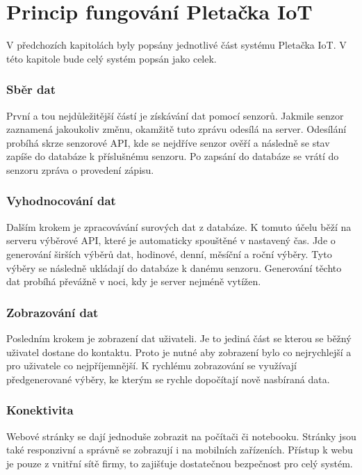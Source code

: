 \chapter{Princip fungování Pletačka IoT}
V předchozích kapitolách byly popsány jednotlivé část systému Pletačka IoT.
V této kapitole bude celý systém popsán jako celek.


\subsection{Sběr dat}
První a tou nejdůležitější částí je získávání dat pomocí senzorů.
Jakmile senzor zaznamená jakoukoliv změnu, okamžitě tuto zprávu odesílá na server.
Odesílání probíhá skrze senzorové API, kde se nejdříve senzor ověří a následně se stav zapíše do databáze k příslušnému senzoru.
Po zapsání do databáze se vrátí do senzoru zpráva o provedení zápisu. 


\subsection{Vyhodnocování dat}
Dalším krokem je zpracovávání surových dat z databáze.
K tomuto účelu běží na serveru výběrové API, které je automaticky spouštěné v nastavený čas.
Jde o generování širších výběrů dat, hodinové, denní, měsíční a roční výběry.
Tyto výběry se následně ukládají do databáze k danému senzoru.
Generování těchto dat probíhá převážně v noci, kdy je server nejméně vytížen.


\subsection{Zobrazování dat}
Posledním krokem je zobrazení dat uživateli.
Je to jediná část se kterou se běžný uživatel dostane do kontaktu.
Proto je nutné aby zobrazení bylo co nejrychlejší a pro uživatele co nejpříjemnější.
K rychlému zobrazování se využívají předgenerované výběry, ke kterým se rychle dopočítají nově nasbíraná data.

\fxnote[author=JA]{\textcolor{mygreen}{schéma sběr - vyhodnocení - zobrazení}}

\subsection{Konektivita}
Webové stránky se dají jednoduše zobrazit na počítači či notebooku.
Stránky jsou také responzivní a správně se zobrazují i na mobilních zařízeních.
Přístup k webu je pouze z vnitřní sítě firmy, to zajišťuje dostatečnou bezpečnost pro celý systém.


\newpage